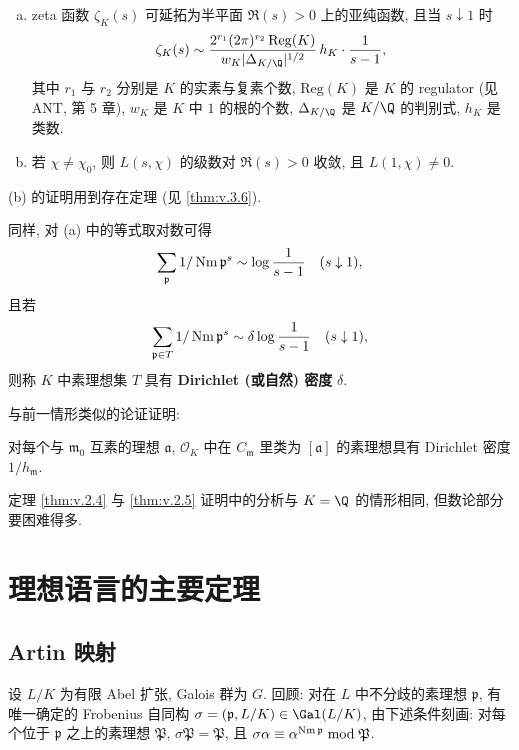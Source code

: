 \begin{theorem}\label{thm:v.2.4}
\begin{enumerate}[(a)]
\item zeta 函数 $\zeta_K(s)$ 可延拓为半平面 $\Re(s)>0$ 上的亚纯函数, 且当 $s\downarrow 1$ 时
\[
\zeta_K(s)\sim\frac{2^{r_1}(2\pi)^{r_2}\,\mathrm{Reg}(K)}{w_K|\Delta_{K/\Q}|^{1/2}}\,h_K\cdot\frac{1}{s-1},
\]
其中 $r_1$ 与 $r_2$ 分别是 $K$ 的实素与复素个数, $\mathrm{Reg}(K)$ 是 $K$ 的 regulator (见 ANT, 第 5 章), $w_K$ 是 $K$ 中 $1$ 的根的个数, $\Delta_{K/\Q}$ 是 $K/\Q$ 的判别式, $h_K$ 是类数.
\item 若 $\chi\ne\chi_0$, 则 $L(s,\chi)$ 的级数对 $\Re(s)>0$ 收敛, 且 $L(1,\chi)\ne 0$.
\end{enumerate}
\end{theorem}

(b) 的证明用到存在定理 (见 \ref{thm:v.3.6}).

同样, 对 (a) 中的等式取对数可得
\[
\sum_{\mathfrak{p}}1/\operatorname{Nm}\mathfrak{p}^s\sim\log\frac{1}{s-1}\quad(s\downarrow 1),
\]
且若
\[
\sum_{\mathfrak{p}\in T}1/\operatorname{Nm}\mathfrak{p}^s\sim\delta\log\frac{1}{s-1}\quad(s\downarrow 1),
\]
则称 $K$ 中素理想集 $T$ 具有 \textbf{Dirichlet (或自然) 密度} $\delta$.

与前一情形类似的论证证明:

\begin{theorem}\label{thm:v.2.5}
对每个与 $\mathfrak{m}_0$ 互素的理想 $\mathfrak{a}$, $\mathcal{O}_K$ 中在 $C_{\mathfrak{m}}$ 里类为 $[\mathfrak{a}]$ 的素理想具有 Dirichlet 密度 $1/h_{\mathfrak{m}}$.
\end{theorem}

定理 \ref{thm:v.2.4} 与 \ref{thm:v.2.5} 证明中的分析与 $K=\Q$ 的情形相同, 但数论部分要困难得多.

\section{理想语言的主要定理}\label{sec:V.3}

\subsection*{Artin 映射}

设 $L/K$ 为有限 Abel 扩张, Galois 群为 $G$. 回顾: 对在 $L$ 中不分歧的素理想 $\mathfrak{p}$, 有唯一确定的 Frobenius 自同构 $\sigma=(\mathfrak{p},L/K)\in\Gal(L/K)$, 由下述条件刻画: 对每个位于 $\mathfrak{p}$ 之上的素理想 $\mathfrak{P}$, $\sigma\mathfrak{P}=\mathfrak{P}$, 且 $\sigma\alpha\equiv\alpha^{\operatorname{Nm}\mathfrak{p}}\bmod\mathfrak{P}$.

